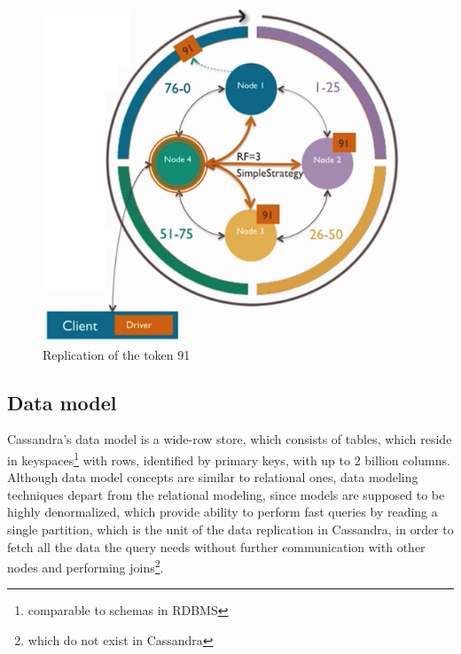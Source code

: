 \begin{figure}[h]
	\centering
	\includegraphics[height=100mm]{images/cassandra-replication-ring.png}\hspace{10mm}
	\caption{Replication of the token 91}
	\label{fig:replicationRing}
\end{figure}





\subsection{Data model}
\label{sec:theory:cassandra:datamodel}
Cassandra's data model is a wide-row store, which consists of tables, which reside in keyspaces\footnote{comparable to schemas in RDBMS} with rows, identified by primary keys, with up to 2 billion columns. Although data model concepts are similar to relational ones, data modeling techniques depart from the relational modeling, since models are supposed to be highly denormalized, which provide ability to perform fast queries by reading a single partition, which is the unit of the data replication in Cassandra, in order to fetch all the data the query needs without further communication with other nodes and performing joins\footnote{which do not exist in Cassandra}.

